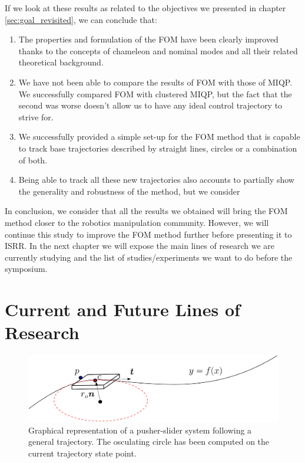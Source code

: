 \documentclass[12,twoside]{TFG-GM}
\theoremstyle{definition}
\theoremstyle{remark}
\begin{document}
If we look at these results as related to the objectives we presented in chapter \ref{sec:goal_revisited}, we can conclude that:
\begin{enumerate}
\item The properties and formulation of the FOM have been clearly improved thanks to the concepts of chameleon and nominal modes and all their related theoretical background.

\item We have not been able to compare the results of FOM with those of MIQP. We successfully compared FOM with clustered MIQP, but the fact that the second was worse doesn't allow us to have any ideal control trajectory to strive for.

\item We successfully provided a simple set-up for the FOM method that is capable to track base trajectories described by straight lines, circles or a combination of both.

\item Being able to track all these new trajectories also accounts to partially show the generality and robustness of the method, but we consider 
\end{enumerate}

In conclusion, we consider that all the results we obtained will bring the FOM method closer to the robotics manipulation community. However, we will continue this study to improve the FOM method further before presenting it to ISRR. In the next chapter we will expose the main lines of research we are currently studying and the list of studies/experiments we want to do before the symposium.

\section{Current and Future Lines of Research}
\label{sec:todo}

\begin{figure}[h!]
\centering
{
\includegraphics[width = 13cm]{curvature.pdf}
\caption{Graphical representation of a pusher-slider system following a general trajectory. The osculating circle has been computed on the current trajectory state point.}
\label{curvature}
}
\end{figure}
\end{document}
